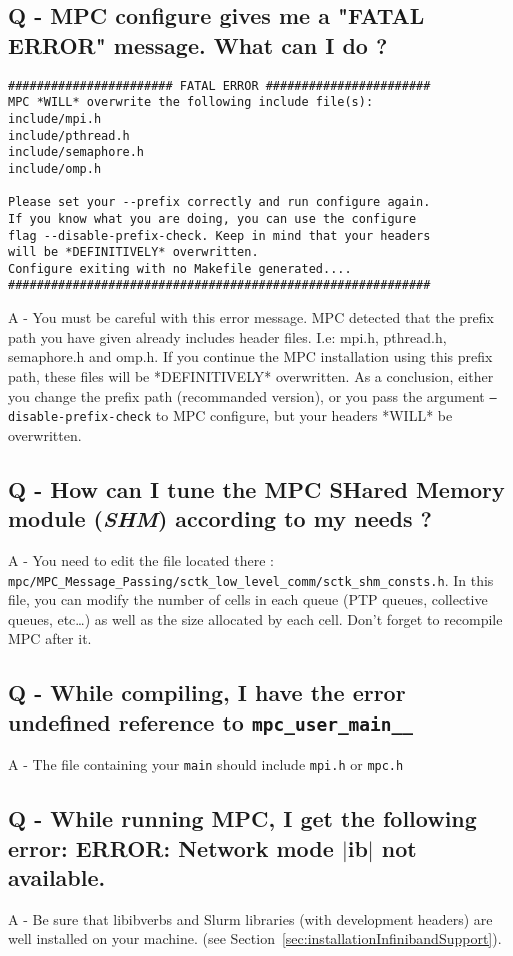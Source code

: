 \documentclass[a4paper,11pt]{article}
\begin{document}
\subsection*{Q - MPC configure gives me a "FATAL ERROR" message. What can I do ?}
\begin{verbatim}
####################### FATAL ERROR #######################
MPC *WILL* overwrite the following include file(s):
include/mpi.h
include/pthread.h
include/semaphore.h
include/omp.h

Please set your --prefix correctly and run configure again.
If you know what you are doing, you can use the configure
flag --disable-prefix-check. Keep in mind that your headers
will be *DEFINITIVELY* overwritten.
Configure exiting with no Makefile generated....
###########################################################
\end{verbatim}
A - You must be careful with this error message. MPC detected that the prefix path you have given already includes header files. I.e: mpi.h, pthread.h, semaphore.h and omp.h.
If you continue the MPC installation using this prefix path, these files will be *DEFINITIVELY* overwritten.
As a conclusion, either you change the prefix path (recommanded version), or you pass the argument {\tt --disable-prefix-check} to MPC configure, but your headers *WILL* be overwritten.

\subsection*{Q - How can I tune the MPC SHared Memory module (\emph{SHM}) according to my needs ?}
A - You need to edit the file located there : \\{\tt mpc/MPC\_Message\_Passing/sctk\_low\_level\_comm/sctk\_shm\_consts.h}. In this file, you can modify the number of cells in each queue (PTP queues, collective queues, etc\dots) as well as the size allocated by each cell. Don't forget to recompile MPC after it.

\subsection*{Q - While compiling, I have the error undefined reference to \texttt{mpc\_user\_main\_\_}}
A - The file containing your \texttt{main} should include \texttt{mpi.h} or \texttt{mpc.h}

\subsection*{Q - While running MPC, I get the following error: ERROR: Network mode $|$ib$|$ not available.}
A - Be sure that libibverbs and Slurm libraries (with development headers) are well installed on your machine. (see Section~\ref{sec:installationInfinibandSupport}).
\end{document}
